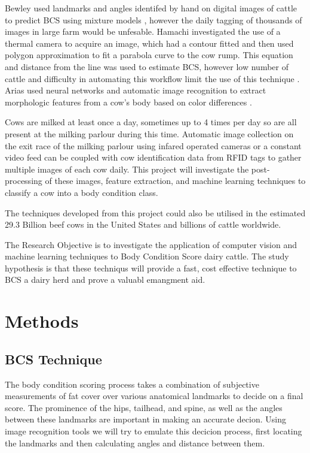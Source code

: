 \documentclass[11pt]{article}
\begin{document}
		Bewley used landmarks and angles identifed by hand on digital images of cattle to predict BCS using mixture models \cite{Bewley2008}, however the daily tagging of thousands of images in large farm would be unfesable.
		Hamachi investigated the use of a thermal camera to acquire an image, which had a contour fitted and then used polygon approximation to fit a parabola curve to the cow rump. This equation and distance from the line was used to estimate BCS, however low number of cattle and difficulty in automating this workflow limit the use of this technique \cite{Halachmi2008}. 
		Arias used neural networks and automatic image recognition to extract morphologic features from a cow's body based on color differences \cite{Arias2004}. 

		
		Cows are milked at least once a day, sometimes up to 4 times per day so are all present at the milking parlour during this time.
		Automatic image collection on the exit race of the milking parlour using infared operated cameras or a constant video feed can be coupled with cow identification data from RFID tags to gather multiple images of each cow daily.  
		This project will investigate the post-processing of these images, feature extraction, and machine learning techniques to classify a cow into a body condition class.  


		The techniques developed from this project could also be utilised in the estimated 29.3 Billion beef cows in the United States\cite{USDA2013} and billions of cattle worldwide.

		The Research Objective is to investigate the application of computer vision and machine learning techniques to Body Condition Score dairy cattle.
		The study hypothesis is that these techniqus will provide a fast, cost effective technique to BCS a dairy herd and prove a valuabl emangment aid.

\newpage
\section{Methods}
	\subsection{BCS Technique}
		The body condition scoring process takes a combination of subjective measurements of fat cover over various anatomical landmarks to decide on a final score.
		The prominence of the hips, tailhead, and spine, as well as the angles between these landmarks are important in making an accurate decion.
		Using image recognition tools we will try to emulate this decicion process, first locating the landmarks and then calculating angles and distance between them.
\end{document}

